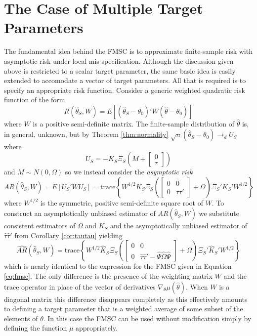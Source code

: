 \section{The Case of Multiple Target Parameters}
\label{append:mult}
  The fundamental idea behind the FMSC is to approximate finite-sample risk with asymptotic risk under local mis-specification.
  Although the discussion given above is restricted to a scalar target parameter, the same basic idea is easily extended to accomodate a vector of target parameters.
  All that is required is to specify an appropriate risk function.
  Consider a generic weighted quadratic risk function of the form
  \[
    R(\widehat{\theta}_S,W) = E\left[ \left( \widehat{\theta}_S - \theta_0 \right)' W \left( \widehat{\theta} - \theta_0 \right)\right]
  \]
  where $W$ is a positive semi-definite matrix.
  The finite-sample distribution of $\widehat{\theta}$ is, in general, unknown, but by Theorem \ref{thm:normality} $\sqrt{n} \left( \widehat{\theta}_S - \theta_0\right) \rightarrow_d U_S$ where
  \[
    U_S = -K_S \Xi_S \left( M + \left[
    \begin{array}{c}
      0 \\ \tau
    \end{array}
  \right]\right)
  \]
  and $M\sim N(0,\Omega)$ so we instead consider the \emph{asymptotic risk}
  \begin{equation*}
    AR(\widehat{\theta}_S, W) = E\left[ U_S' W U_S \right] =
     \mbox{trace}\left\{ W^{1/2}K_S \Xi_S 
      \left( \left[
      \begin{array}{cc}
        0 & 0 \\
        0 & \tau \tau'
      \end{array}
    \right] + \Omega\right)
    \Xi_S' K_S'W^{1/2} \right\}
  \end{equation*}
  where $W^{1/2}$ is the symmetric, positive semi-definite square root of $W$.
  To construct an asymptotically unbiased estimator of $AR(\widehat{\theta}_S, W)$ we substitute consistent estimators of $\Omega$ and $K_S$ and the asymptotically unbiased estimator of $\widehat{\tau}\widehat{\tau}'$ from Corollary \ref{cor:tautau} yielding
  \[
    \widehat{AR}\left( \widehat{\theta}_S, W \right) = 
    \mbox{trace}\left\{ W^{1/2}\widehat{K}_S \Xi_S 
      \left( \left[
      \begin{array}{cc}
        0 & 0 \\
        0 & \widehat{\tau}\widehat{\tau}' - \widehat{\Psi}\widehat{\Omega}\widehat{\Psi}
      \end{array}
    \right] + \Omega\right)
    \Xi_S' \widehat{K}_S'W^{1/2} \right\}
  \]
  which is nearly identical to the expression for the FMSC given in Equation \ref{eq:fmsc}.
  The only difference is the presence of the weighting matrix $W$ and the trace operator in place of the vector of derivatives $\nabla_\theta\mu(\widehat{\theta})$.
  When $W$ is a diagonal matrix this difference disappears completely as this effectively amounts to defining a target parameter that is a weighted average of some subset of the elements of $\theta$.
  In this case the FMSC can be used without modification simply by defining the function $\mu$ appropriately.
